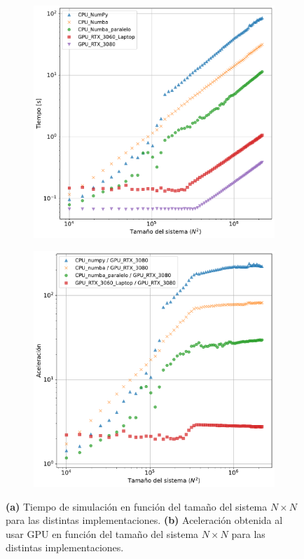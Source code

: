 \begin{figure}[ht]
\hspace*{-.6cm}
\begin{subfigure}{.51\textwidth}
  \centering
  \includegraphics[width=\textwidth]{cpuvsgpu.pdf}
  \caption{}
\end{subfigure}
\begin{subfigure}{.51\textwidth}
  \centering
  \includegraphics[width=\textwidth]{cpuvsgpu_ratio.pdf}
  \caption{}
\end{subfigure}
\caption[Tiempo de simulaciones en función del tamaño del sistema en CPUs y GPUs.]{\textbf{(a)} Tiempo de simulación en función del tamaño del sistema $N \times N$ para las distintas implementaciones. \textbf{(b)} Aceleración obtenida al usar GPU en función del tamaño del sistema $N \times N$ para las distintas implementaciones.}
\label{fig:cpuvsgpu}
\end{figure}

